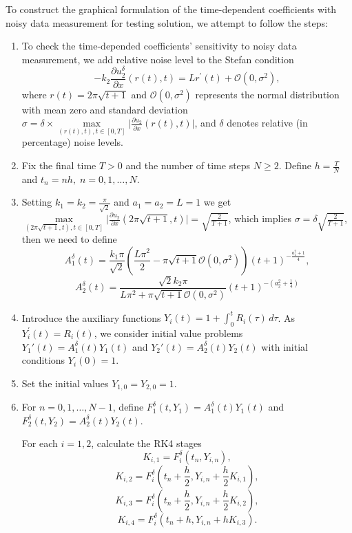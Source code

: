 \documentclass[preprint,12pt,authoryear]{elsarticle}
\begin{document}
To construct the graphical formulation of the time-dependent coefficients with noisy data measurement for testing solution, we attempt to follow the steps:


\begin{enumerate}
\item To check the time-depended coefficients' sensitivity to noisy data measurement, we add relative noise level to the Stefan condition
$$-k_2\frac{\partial u_2^{\delta}}{\partial x}(r(t),t)=Lr^{\prime}(t)+\mathcal{O}(0,\sigma^2),$$
where $r(t)=2\pi\sqrt{t+1}$ and $\mathcal{O}(0,\sigma^2)$ represents the normal distribution with mean zero and standard deviation $\sigma=\delta\times\max\limits_{(r(t),t),t\in[0,T]}\bigg|\frac{\partial u_2}{\partial x}(r(t),t)\bigg|$, and $\delta$ denotes relative (in percentage) noise levels. 

\item Fix the final time $T>0$ and the number of time steps $N\geq 2$. Define $h=\frac{T}{N}$ and $t_n=nh,\; n=0,1,\ldots,N.$

\item Setting $k_1=k_2=\frac{\pi}{\sqrt{2}}$ and  $a_1=a_2=L=1$ we get $\max\limits_{(2\pi\sqrt{t+1},t),t\in[0,T]}\bigg|\frac{\partial u_2}{\partial x}(2\pi\sqrt{t+1},t)\bigg|=\sqrt{\frac{2}{T+1}}$, which implies $\sigma=\delta\sqrt{\frac{2}{T+1}}$, then we need to define $$A_1^{\delta}(t)=\frac{k_1\pi}{\sqrt{2}}\left(\frac{L\pi^2}{2}-\pi\sqrt{t+1}\mathcal{O}(0,\sigma^2)\right)(t+1)^{-\frac{a_1^2+1}{4}},$$
$$A_2^{\delta}(t)=\frac{\sqrt{2}k_2\pi}{L\pi^2+\pi\sqrt{t+1}\mathcal{O}(0,\sigma^2)}(t+1)^{-(a_2^2+\frac{1}{4})}$$

\item Introduce the auxiliary functions $Y_i(t)=1+\int_0^t R_i(\tau)\,d\tau
$. As $Y_i^{\prime}(t)=R_i(t)$, we consider initial value problems $Y_1'(t)=A_1^{\delta}(t)Y_1(t)$ and $ Y_2'(t)=A_2^{\delta}(t)Y_2(t)$ with initial conditions $Y_i(0)=1$.

\item Set the initial values $Y_{1,0}=Y_{2,0}=1$.

\item For $n=0,1,\ldots,N-1$, define $F_1^{\delta}(t,Y_1)=A_1^{\delta}(t)Y_1(t)$ and $F_2^{\delta}(t,Y_2)=A_2^{\delta}(t)Y_2(t)$.

For each $i=1,2$, calculate the RK4 stages
\[
K_{i,1}=F_i^{\delta}(t_n,Y_{i,n}),
\]
\[
K_{i,2}=F_i^{\delta}\left(t_n+\frac{h}{2},Y_{i,n}+\frac{h}{2}K_{i,1}\right),
\]
\[
K_{i,3}=F_i^{\delta}\left(t_n+\frac{h}{2},Y_{i,n}+\frac{h}{2}K_{i,2}\right),
\]
\[
K_{i,4}=F_i^{\delta}\left(t_n+h,Y_{i,n}+hK_{i,3}\right).
\]


\end{enumerate}
\end{document}
